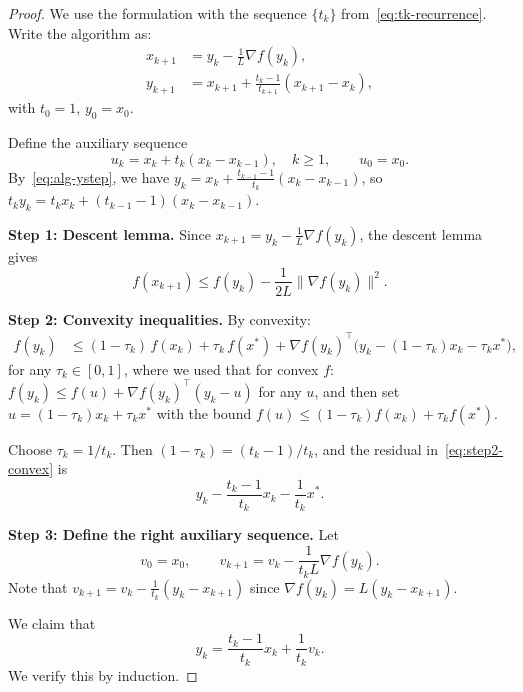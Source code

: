 \documentclass[11pt,a4paper]{article}
\begin{document}
\begin{proof}
We use the formulation with the sequence $\{t_k\}$
from~\eqref{eq:tk-recurrence}. Write the algorithm as:
\begin{align}
  x_{k+1} &= y_k - \frac{1}{L}\nabla f(y_k), \label{eq:alg-xstep} \\
  y_{k+1} &= x_{k+1} + \frac{t_k - 1}{t_{k+1}}(x_{k+1} - x_k),
    \label{eq:alg-ystep}
\end{align}
with $t_0 = 1$, $y_0 = x_0$.

Define the auxiliary sequence
\begin{equation}\label{eq:uk-def}
  u_k = x_k + t_k(x_k - x_{k-1}), \quad k \ge 1,
  \qquad u_0 = x_0.
\end{equation}
By~\eqref{eq:alg-ystep}, we have
$y_k = x_k + \frac{t_{k-1}-1}{t_k}(x_k - x_{k-1})$, so
$t_k y_k = t_k x_k + (t_{k-1}-1)(x_k - x_{k-1})$.

\textbf{Step 1: Descent lemma.}
Since $x_{k+1} = y_k - \frac{1}{L}\nabla f(y_k)$, the descent lemma
gives
\begin{equation}\label{eq:step1}
  f(x_{k+1}) \le f(y_k) - \frac{1}{2L}\|\nabla f(y_k)\|^2.
\end{equation}

\textbf{Step 2: Convexity inequalities.}
By convexity:
\begin{align}
  f(y_k) &\le (1 - \tau_k)\,f(x_k) + \tau_k\,f(x^*)
  + \nabla f(y_k)^\top\bigl(y_k - (1-\tau_k)x_k - \tau_k x^*\bigr),
    \label{eq:step2-convex}
\end{align}
for any $\tau_k \in [0,1]$, where we used that for convex $f$:
$f(y_k) \le f(u) + \nabla f(y_k)^\top(y_k - u)$ for any $u$, and then
set $u = (1-\tau_k)x_k + \tau_k x^*$ with the bound
$f(u) \le (1-\tau_k)f(x_k) + \tau_k f(x^*)$.

Choose $\tau_k = 1/t_k$. Then $(1-\tau_k) = (t_k - 1)/t_k$, and
the residual in~\eqref{eq:step2-convex} is
\[
  y_k - \frac{t_k - 1}{t_k}x_k - \frac{1}{t_k}x^*.
\]

\textbf{Step 3: Define the right auxiliary sequence.}
Let
\begin{equation}\label{eq:vk-def-clean}
  v_0 = x_0, \qquad
  v_{k+1} = v_k - \frac{1}{t_k L}\nabla f(y_k).
\end{equation}
Note that $v_{k+1} = v_k - \frac{1}{t_k}(y_k - x_{k+1})$
since $\nabla f(y_k) = L(y_k - x_{k+1})$.

We claim that
\begin{equation}\label{eq:yk-vk-relation}
  y_k = \frac{t_k - 1}{t_k}x_k + \frac{1}{t_k}v_k.
\end{equation}
We verify this by induction.


\end{proof}
\end{document}
